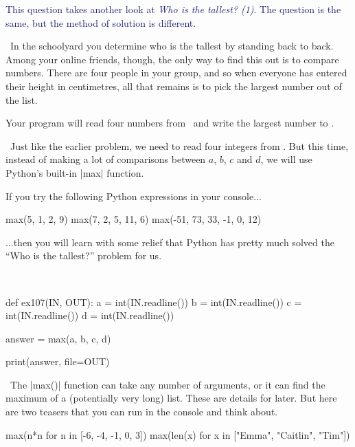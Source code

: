 

\textcolor{MidnightBlue}{This question takes another look at \emph{Who is the tallest?  (1)}.
The question is the same, but the method of solution is different.}

\Question\ In the schoolyard you determine who is the tallest by standing back to back.
Among your online friends, though, the only way to find this out is to compare numbers.
There are four people in your group, and so when everyone has entered their height in
centimetres, all that remains is to pick the largest number out of the list.

Your program will read four numbers from \IN\ and write the largest number to \OUT.

\Sample


\Scratch\ Just like the earlier problem, we need to read four integers from \IN. But this
time, instead of making a lot of comparisons between $a$, $b$, $c$ and $d$, we will use
Python's built-in \pycode|max| function.

If you try the following Python expressions in your console...

\begin{pythoncode}
    max(5, 1, 2, 9)
    max(7, 2, 5, 11, 6)
    max(-51, 73, 33, -1, 0, 12)
\end{pythoncode}

...then you will learn with some relief that Python has pretty much solved the ``Who is
the tallest?'' problem for us.

\Solution\

\begin{pythoncode}
  def ex107(IN, OUT):
    a = int(IN.readline())
    b = int(IN.readline())
    c = int(IN.readline())
    d = int(IN.readline())

    answer = max(a, b, c, d)

    print(answer, file=OUT)
\end{pythoncode}

\Afterword\ The \pycode|max()| function can take any number of arguments, or it can find
the maximum of a (potentially very long) list. These are details for later. But here are
two teasers that you can run in the console and think about.

\begin{pythoncode} 
  max(n*n for n in [-6, -4, -1, 0, 3])
  max(len(x) for x in ["Emma", "Caitlin", "Tim"])
\end{pythoncode}

